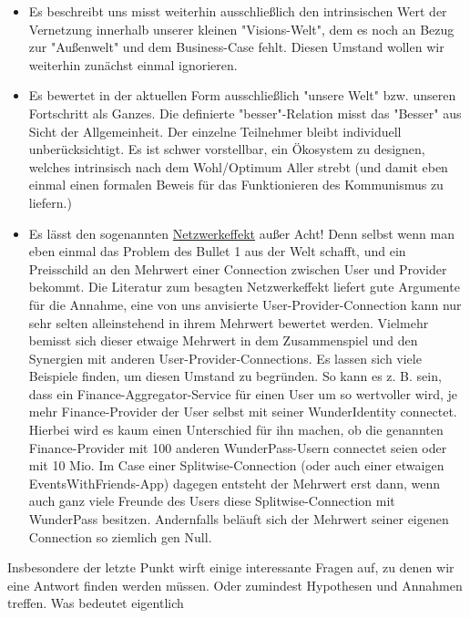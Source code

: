 \documentclass[11pt]{scrartcl}
\begin{document}
\begin{itemize}
  \item Es beschreibt uns misst weiterhin ausschließlich den intrinsischen Wert der Vernetzung innerhalb unserer kleinen "Visions-Welt", dem es noch an Bezug zur "Außenwelt" und dem Business-Case fehlt. Diesen Umstand wollen wir weiterhin zunächst einmal ignorieren.
  \item Es bewertet in der aktuellen Form ausschließlich "unsere Welt" bzw. unseren Fortschritt als Ganzes. Die definierte "besser"-Relation misst das "Besser" aus Sicht der Allgemeinheit. Der einzelne Teilnehmer bleibt individuell unberücksichtigt. Es ist schwer vorstellbar, ein Ökosystem zu designen, welches intrinsisch nach dem Wohl/Optimum Aller strebt (und damit eben einmal einen formalen Beweis für das Funktionieren des Kommunismus zu liefern.) 
  \item Es lässt den sogenannten \href{https://de.wikipedia.org/wiki/Netzwerkeffekt}{Netzwerkeffekt} außer Acht! Denn selbst wenn man eben einmal das Problem des Bullet 1 aus der Welt schafft, und ein Preisschild an den Mehrwert einer Connection zwischen User und Provider bekommt. Die Literatur zum besagten Netzwerkeffekt liefert gute Argumente für die Annahme, eine von uns anvisierte User-Provider-Connection kann nur sehr selten alleinstehend in ihrem Mehrwert bewertet werden. Vielmehr bemisst sich dieser etwaige Mehrwert in dem Zusammenspiel und den Synergien mit anderen User-Provider-Connections. Es lassen sich viele Beispiele finden, um diesen Umstand zu begründen. So kann es z. B. sein, dass ein Finance-Aggregator-Service für einen User um so wertvoller wird, je mehr Finance-Provider der User selbst mit seiner WunderIdentity connectet. Hierbei wird es kaum einen Unterschied für ihn machen, ob die genannten Finance-Provider mit 100 anderen WunderPass-Usern connectet seien oder mit 10 Mio. Im Case einer Splitwise-Connection (oder auch einer etwaigen EventsWithFriends-App) dagegen entsteht der Mehrwert erst dann, wenn auch ganz viele Freunde des Users diese Splitwise-Connection mit WunderPass besitzen. Andernfalls beläuft sich der Mehrwert seiner eigenen Connection so ziemlich gen Null.
\end{itemize}

\vspace{1cm}

Insbesondere der letzte Punkt wirft einige interessante Fragen auf, zu denen wir eine Antwort finden werden müssen. Oder zumindest Hypothesen und Annahmen treffen.
Was bedeutet eigentlich
\end{document}
